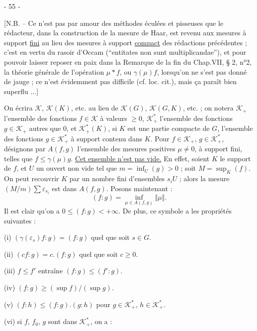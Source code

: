 
\begin{center}- 55 -\end{center}

[N.B. -- Ce n'est pas par amour des méthodes éculées et pisseuses que le rédacteur, dans la construction de la mesure de Haar, est revenu aux mesures à support \uline{fini} au lieu des mesures à support \uline{compact} des rédactions précédentes ; c'est en vertu du rasoir d'Occam (``entitates non sunt multiplicandae''), et pour pouvoir laisser reposer en paix dans la Remarque de la fin du Chap.VII, § 2, n°2, la théorie générale de l'opération $\mu*f$, ou $\gamma(\mu)f$, lorsqu'on ne s'est pas donné de jauge ; ce n'est évidemment pas difficile (cf. loc. cit.), mais ça paraît bien superflu $\ldots$]

On écrira $\mathcal{K}$, $\mathcal{K}(K)$, etc. au lieu de $\mathcal{K}(G)$, $\mathcal{K}(G,K)$, etc. ; on notera $\mathcal{K}_+$ l'ensemble des fonctions $f\in\mathcal{K}$ à valeurs $\geq0$, $\mathcal{K}^*_+$ l'ensemble des fonctions $g\in\mathcal{K}_+$ autres que $0$, et $\mathcal{K}^*_+(K)$, si $K$ est une partie compacte de $G$, l'ensemble des fonctions $g\in\mathcal{K}^*_+$ à support contenu dans $K$. Pour $f\in\mathcal{K}_+$, $g\in\mathcal{K}^*_+$, désignons par $A(f,g)$ l'ensemble des mesures positives $\mu\neq0$, à support fini, telles que $f\leq\gamma(\mu)g$. \uline{Cet ensemble n'est pas vide.} En effet, soient $K$ le support de $f$, et $U$ un ouvert non vide tel que $m=\inf_U(g)>0$ ; soit $M=\sup_K(f)$. On peut recouvrir $K$ par un nombre fini d'ensembles $s_iU$ ; alors la mesure $(M/m)\sum\varepsilon_{s_i}$ est dans $A(f,g)$. Posons maintenant :
\[
(f:g)=\inf_{\mu\in A(f,g)}\Vert\mu\Vert.
\]
Il est clair qu'on a $0\leq(f:g)<+\infty$. De plus, ce symbole a les propriétés suivantes :

(i) $(\gamma(\varepsilon_s)f:g)=(f:g)$ quel que soit $s\in G$.

(ii) $(cf:g)=c.(f:g)$ quel que soit $c\geq0$.

(iii) $f\leq f'$ entraîne $(f:g)\leq(f':g)$.

(iv) $(f:g)\geq(\sup f)/(\sup g)$.

(v) $(f:h)\leq(f:g).(g:h)$ pour $g\in\mathcal{K}^*_+$, $h\in\mathcal{K}^*_+$.

(vi) si $f$, $f_0$, $g$ sont dans $\mathcal{K}^*_+$, on a :

